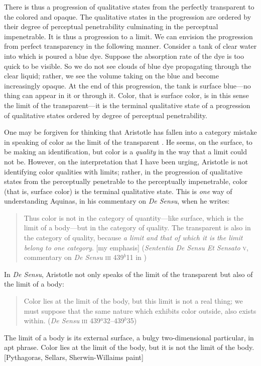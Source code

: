 \documentclass[12pt]{article}
\begin{document}
There is thus a progression of qualitative states from the perfectly transparent to the colored and opaque. The qualitative states in the progression are ordered by their degree of perceptual penetrability culminating in the perceptual impenetrable. It is thus a progression to a limit. We can envision the progression from perfect transparency in the following manner. Consider a tank of clear water into which is poured a blue dye. Suppose the absorption rate of the dye is too quick to be visible. So we do not see clouds of blue dye propagating through the clear liquid; rather, we see the volume taking on the blue and become increasingly opaque. At the end of this progression, the tank is surface blue---no thing can appear in it or through it. Color, that is surface color, is in this sense the limit of the transparent---it is the terminal qualitative state of a progression of qualitative states ordered by degree of perceptual penetrability.

One may be forgiven for thinking that Aristotle has fallen into a category mistake in speaking of color as the limit of the transparent \citep[65]{Broackes:1999uq}. He seems, on the surface, to be making an identification, but color is a \emph{quality} in the way that a limit could not be. However, on the interpretation that I have been urging, Aristotle is not identifying color qualities with limits; rather, in the progression of qualitative states from the perceptually penetrable to the perceptually impenetrable, color (that is, surface color) is the terminal qualitative state. This is \emph{one} way of understanding Aquinas, in his commentary on \emph{De Sensu}, when he writes:
\begin{quote}
	Thus color is not in the category of quantity---like surface, which is the limit of a body---but in the category of quality. The transparent is also in the category of quality, because \emph{a limit and that of which it is the limit belong to one category}. [my emphasis] (\emph{Sententia De Sensu Et Sensato} \textsc{v}, commentary on \emph{De Sensu} \textsc{iii} 439\( ^{b} \)11 in \citealt{White:2005vn})
\end{quote}

In \emph{De Sensu}, Aristotle not only speaks of the limit of the transparent but also of the limit of a body:
\begin{quote}
	Color lies at the limit of the body, but this limit is not a real thing; we must suppose that the same nature which exhibits color outside, also exists within. (\emph{De Sensu} \textsc{iii} 439\( ^{a} \)32--439\( ^{b} \)35)
\end{quote}
The limit of a body is its external surface, a bulgy two-dimensional particular, in \citet[]{Sellars:1956xp} apt phrase. Color lies at the limit of the body, but it is not the limit of the body. [Pythagoras, Sellars, Sherwin-Willaims paint]
\end{document}
